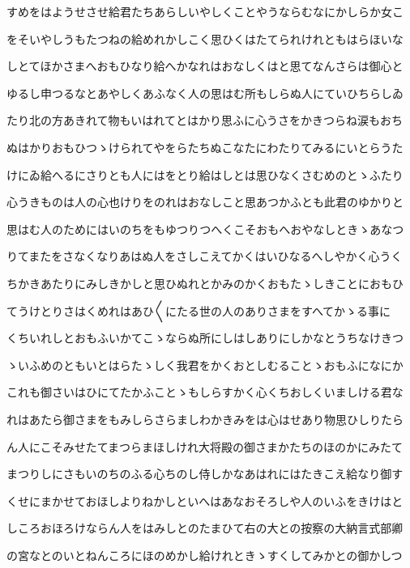 \documentclass[a4paper,11pt,landscape]{ltjtarticle}
\begin{document}
\par\medskip
すめをはようせさせ給君たちあらしいやしくことやうならむなにかしらか女こ
\par\medskip
をそいやしうもたつねの給めれかしこく思ひくはたてられけれともはらほいな
\par\medskip
しとてほかさまへおもひなり給へかなれはおなしくはと思てなんさらは御心と
\par\medskip
ゆるし申つるなとあやしくあふなく人の思はむ所もしらぬ人にていひちらしゐ
\par\medskip
たり北の方あきれて物もいはれてとはかり思ふに心うさをかきつらね涙もおち
\par\medskip
ぬはかりおもひつゝけられてやをらたちぬこなたにわたりてみるにいとらうた
\par\medskip
けにゐ給へるにさりとも人にはをとり給はしとは思ひなくさむめのとゝふたり
\par\medskip
心うきものは人の心也けりをのれはおなしこと思あつかふとも此君のゆかりと
\par\medskip
思はむ人のためにはいのちをもゆつりつへくこそおもへおやなしときゝあなつ
\par\medskip
りてまたをさなくなりあはぬ人をさしこえてかくはいひなるへしやかく心うく
\par\medskip
ちかきあたりにみしきかしと思ひぬれとかみのかくおもたゝしきことにおもひ
\par\medskip
てうけとりさはくめれはあひ〱にたる世の人のありさまをすへてかゝる事に
\par\medskip
くちいれしとおもふいかてこゝならぬ所にしはしありにしかなとうちなけきつ
\par\medskip
ゝいふめのともいとはらたゝしく我君をかくおとしむることゝおもふになにか
\par\medskip
これも御さいはひにてたかふことゝもしらすかく心くちおしくいましける君な
\par\medskip
れはあたら御さまをもみしらさらましわかきみをは心はせあり物思ひしりたら
\par\medskip
ん人にこそみせたてまつらまほしけれ大将殿の御さまかたちのほのかにみたて
\par\medskip
まつりしにさもいのちのふる心ちのし侍しかなあはれにはたきこえ給なり御す
\par\medskip
くせにまかせておほしよりねかしといへはあなおそろしや人のいふをきけはと
\par\medskip
しころおほろけならん人をはみしとのたまひて右の大との按察の大納言式部卿
\par\medskip
の宮なとのいとねんころにほのめかし給けれときゝすくしてみかとの御かしつ
\end{document}
